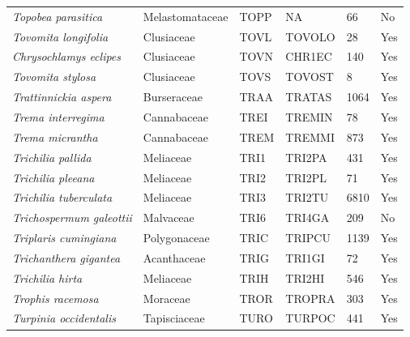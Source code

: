 \documentclass[11pt]{article}
\begin{document}
\begin{longtable}{@{}llllll@{}}
\textit{Topobea parasitica}                           & Melastomataceae  & TOPP   & NA     & 66              & No        \\
\textit{Tovomita longifolia}                          & Clusiaceae       & TOVL   & TOVOLO & 28              & Yes       \\
\textit{Chrysochlamys eclipes}                        & Clusiaceae       & TOVN   & CHR1EC & 140             & Yes       \\
\textit{Tovomita stylosa}                             & Clusiaceae       & TOVS   & TOVOST & 8               & Yes       \\
\textit{Trattinnickia aspera}                         & Burseraceae      & TRAA   & TRATAS & 1064            & Yes       \\
\textit{Trema interregima}                            & Cannabaceae      & TREI   & TREMIN & 78              & Yes       \\
\textit{Trema micrantha}                              & Cannabaceae      & TREM   & TREMMI & 873             & Yes       \\
\textit{Trichilia pallida}                            & Meliaceae        & TRI1   & TRI2PA & 431             & Yes       \\
\textit{Trichilia pleeana}                            & Meliaceae        & TRI2   & TRI2PL & 71              & Yes       \\
\textit{Trichilia tuberculata}                        & Meliaceae        & TRI3   & TRI2TU & 6810            & Yes       \\
\textit{Trichospermum galeottii}                      & Malvaceae        & TRI6   & TRI4GA & 209             & No        \\
\textit{Triplaris cumingiana}                         & Polygonaceae     & TRIC   & TRIPCU & 1139            & Yes       \\
\textit{Trichanthera gigantea}                        & Acanthaceae      & TRIG   & TRI1GI & 72              & Yes       \\
\textit{Trichilia hirta}                              & Meliaceae        & TRIH   & TRI2HI & 546             & Yes       \\
\textit{Trophis racemosa}                             & Moraceae         & TROR   & TROPRA & 303             & Yes       \\
\textit{Turpinia occidentalis}                        & Tapisciaceae     & TURO   & TURPOC & 441             & Yes       \\

\end{longtable}
\end{document}
